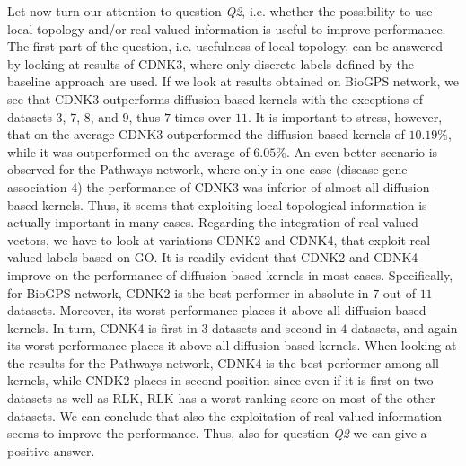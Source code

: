 \documentclass[review]{elsarticle}
\begin{document}
Let now turn our attention to question {\it Q2}, i.e. whether the possibility to use local topology and/or real valued information is useful to improve performance.
The first part of the question, i.e. usefulness of local topology, can be answered by looking at results of CDNK3, where only discrete labels defined by the baseline approach are used. If we look at results obtained on BioGPS network, we see that CDNK3 outperforms diffusion-based kernels with the 
 exceptions of datasets $3$, $7$, $8$, and $9$, thus $7$ times over $11$. It is important to stress, however, that on the average CDNK3 outperformed the diffusion-based kernels of $10.19\%$, while it was outperformed on the average of $6.05\%$. An even better scenario is observed for the Pathways network, where only in one case (disease gene association $4$) the performance of CDNK3 was inferior of almost all diffusion-based kernels.
Thus, it seems that exploiting local topological information is actually important in many cases. 
Regarding the integration of real valued vectors, we have to look at variations CDNK2 and CDNK4, that exploit real valued labels based on GO.
It is readily evident that CDNK2 and CDNK4 improve on the performance of diffusion-based kernels in most cases. Specifically, for BioGPS network,
CDNK2 is the best performer in absolute in $7$ out of $11$ datasets. Moreover, its worst performance places it above all diffusion-based kernels.
In turn, CDNK4 is first in $3$ datasets and second in $4$ datasets, and again its worst performance places it above all diffusion-based kernels.
When looking at the results for the Pathways network, CDNK4 is the best performer among all kernels, while CNDK2 places in second position since
even if it is first on two datasets as well as RLK, RLK has a worst ranking score on most of the other datasets.
We can conclude that also the exploitation of real valued information seems to improve the performance. Thus, also for question  {\it Q2} we can give a positive answer.
\end{document}
